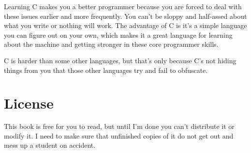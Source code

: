 Learning C makes you a better programmer because you are forced to deal with
these issues earlier and more frequently.  You can't be sloppy and half-assed
about what you write or nothing will work.  The advantage of C is it's a
simple language you can figure out on your own, which makes it a great language
for learning about the machine and getting stronger in these core programmer
skills.

C is harder than some other languages, but that's only because C's not hiding
things from you that those other languages try and fail to obfuscate.

\section*{License}

This book is free for you to read, but until I'm done you can't distribute it
or modify it.  I need to make sure that unfinished copies of it do not get out
and mess up a student on accident.


